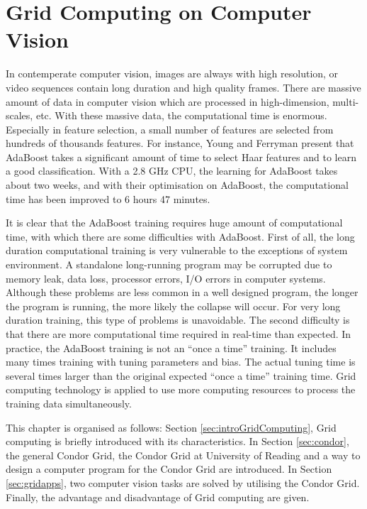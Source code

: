 \chapter{Grid Computing on Computer Vision}
\label{sec:gridcomputing}
In contemperate computer vision, images are always with high resolution, or video sequences contain long duration and high quality frames. There are massive amount of data in computer vision which are processed in high-dimension, multi-scales, etc. With these massive data, the computational time is enormous. Especially in feature selection, a small number of features are selected from hundreds of thousands features. For instance, Young and Ferryman \cite{Young2005} present that AdaBoost takes a significant amount of time to select Haar features and to learn a good classification. With a 2.8 GHz CPU, the learning for AdaBoost takes about two weeks, and with their optimisation on AdaBoost, the computational time has been improved to 6 hours 47 minutes.

It is clear that the AdaBoost training requires huge amount of computational time, with which there are some difficulties with AdaBoost. First of all, the long duration computational training is very vulnerable to the exceptions of system environment. A standalone long-running program may be corrupted due to memory leak, data loss, processor errors, I/O errors in computer systems. Although these problems are less common in a well designed program, the longer the program is running, the more likely the collapse will occur. For very long duration training, this type of problems is unavoidable. The second difficulty is that there are more computational time required in real-time than expected. In practice, the AdaBoost training is not an ``once a time'' training. It includes many times training with tuning parameters and bias. The actual tuning time is several times larger than the original expected ``once a time'' training time. Grid computing technology is applied to use more computing resources to process the training data simultaneously.

This chapter is organised as follows: \mbox{Section} \ref{sec:introGridComputing}, Grid computing is briefly introduced with its characteristics. In \mbox{Section} \ref{sec:condor}, the general Condor Grid, the Condor Grid at University of Reading and a way to design a computer program for the Condor Grid are introduced. In \mbox{Section} \ref{sec:gridapps}, two computer vision tasks are solved by utilising the Condor Grid. Finally, the advantage and disadvantage of Grid computing are given.

